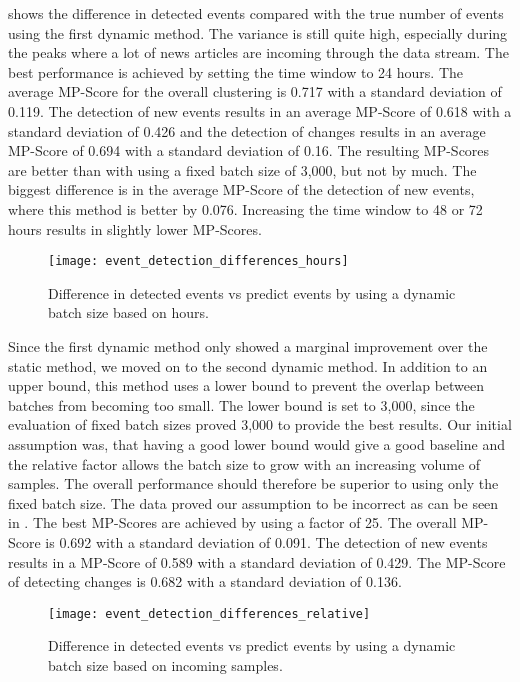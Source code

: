  shows the difference in detected events
compared with the true number of events using the first dynamic method.
The variance is still quite high, especially during the peaks
where a lot of news articles are incoming through the data stream.
The best performance is achieved by setting the time window to 24 hours.
The average MP-Score for the overall clustering is 0.717 with a standard deviation of 0.119.
The detection of new events results in an average MP-Score of 0.618 with a standard deviation of 0.426
and the detection of changes results in an average MP-Score of 0.694 with a standard deviation of 0.16.
The resulting MP-Scores are better than with using a fixed batch size of 3,000, but not by much.
The biggest difference is in the average MP-Score of the detection of new events,
where this method is better by 0.076.
Increasing the time window to 48 or 72 hours results in slightly lower MP-Scores.

\begin{figure}[h]
    \centering
    \texttt{[image: event\_detection\_differences\_hours]}
    \caption{Difference in detected events vs predict events by using a dynamic batch size based on hours.}
    \label{fig:event_detection_differences_hours}
\end{figure}

Since the first dynamic method only showed a marginal improvement over the static method,
we moved on to the second dynamic method.
In addition to an upper bound, this method uses a lower bound
to prevent the overlap between batches from becoming too small.
The lower bound is set to 3,000, since the evaluation of fixed batch sizes proved 3,000 to provide the best results.
Our initial assumption was, that having a good lower bound
would give a good baseline and the relative factor allows the batch size
to grow with an increasing volume of samples.
The overall performance should therefore be superior to using only the fixed batch size.
The data proved our assumption to be incorrect as can be seen in .
The best MP-Scores are achieved by using a factor of 25.
The overall MP-Score is 0.692 with a standard deviation of 0.091.
The detection of new events results in a MP-Score of 0.589 with a standard deviation of 0.429.
The MP-Score of detecting changes is 0.682 with a standard deviation of 0.136.

\begin{figure}[h]
   \centering
   \texttt{[image: event\_detection\_differences\_relative]}
   \caption{Difference in detected events vs predict events by using a dynamic batch size based on incoming samples.}
   \label{fig:event_detection_differences_relative}
\end{figure}

